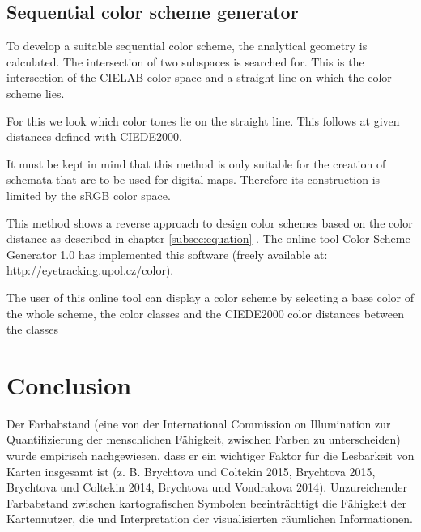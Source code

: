 \subsection{Sequential color scheme generator}
To develop a suitable sequential color scheme, the analytical geometry is calculated. The intersection of two subspaces is searched for. This is the intersection of the CIELAB color space and a straight line on which the color scheme lies.

For this we look which color tones lie on the straight line. This follows at given distances defined with CIEDE2000. 

It must be kept in mind that this method is only suitable for the creation of schemata that are to be used for digital maps. Therefore its construction is limited by the sRGB color space. 

This method shows a reverse approach to design color schemes based on the color distance as described in chapter \ref{subsec:equation} \parencite{brychtova2017}. The online tool Color Scheme Generator 1.0 has implemented this software (freely available at: http://eyetracking.upol.cz/color).

The user of this online tool can display a color scheme by selecting a base color of the whole scheme, the color classes and the CIEDE2000 color distances between the classes \parencite{brychtovaDole2015}

\section{Conclusion}

Der Farbabstand (eine von der International Commission on Illumination zur Quantifizierung der menschlichen Fähigkeit, zwischen Farben zu unterscheiden) wurde empirisch nachgewiesen, dass er ein wichtiger Faktor für die Lesbarkeit von Karten insgesamt ist (z. B. Brychtova und Coltekin 2015, Brychtova 2015, Brychtova und Coltekin 2014, Brychtova und Vondrakova 2014). Unzureichender Farbabstand zwischen kartografischen Symbolen beeinträchtigt die Fähigkeit der Kartennutzer, die und Interpretation der visualisierten räumlichen Informationen.

\parencite{brychtovaDole2015}



%